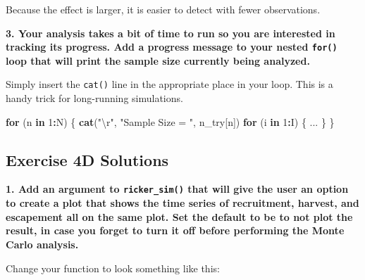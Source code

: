\documentclass[]{book}
\newenvironment{Shaded}{\begin{snugshade}}{\end{snugshade}}
\newcommand{\CharTok}[1]{\textcolor[rgb]{0.31,0.60,0.02}{#1}}
\newcommand{\ControlFlowTok}[1]{\textcolor[rgb]{0.13,0.29,0.53}{\textbf{#1}}}
\newcommand{\DecValTok}[1]{\textcolor[rgb]{0.00,0.00,0.81}{#1}}
\newcommand{\KeywordTok}[1]{\textcolor[rgb]{0.13,0.29,0.53}{\textbf{#1}}}
\newcommand{\NormalTok}[1]{#1}
\newcommand{\OperatorTok}[1]{\textcolor[rgb]{0.81,0.36,0.00}{\textbf{#1}}}
\newcommand{\StringTok}[1]{\textcolor[rgb]{0.31,0.60,0.02}{#1}}
\begin{document}
Because the effect is larger, it is easier to detect with fewer observations.

\textbf{3. Your analysis takes a bit of time to run so you are interested in tracking its progress. Add a progress message to your nested \texttt{for()} loop that will print the sample size currently being analyzed.}

Simply insert the \texttt{cat()} line in the appropriate place in your loop. This is a handy trick for long-running simulations.

\begin{Shaded}
\begin{Highlighting}[]
\ControlFlowTok{for}\NormalTok{ (n }\ControlFlowTok{in} \DecValTok{1}\OperatorTok{:}\NormalTok{N) \{}
  \KeywordTok{cat}\NormalTok{(}\StringTok{"}\CharTok{\textbackslash{}r}\StringTok{"}\NormalTok{, }\StringTok{"Sample Size = "}\NormalTok{, n_try[n])}
  \ControlFlowTok{for}\NormalTok{ (i }\ControlFlowTok{in} \DecValTok{1}\OperatorTok{:}\NormalTok{I) \{}
\NormalTok{    ...}
\NormalTok{  \}}
\NormalTok{\}}
\end{Highlighting}
\end{Shaded}

\hypertarget{ex4d-answers}{%
\subsection*{Exercise 4D Solutions}\label{ex4d-answers}}

\textbf{1. Add an argument to \texttt{ricker\_sim()} that will give the user an option to create a plot that shows the time series of recruitment, harvest, and escapement all on the same plot. Set the default to be to not plot the result, in case you forget to turn it off before performing the Monte Carlo analysis.}

Change your function to look something like this:
\end{document}
